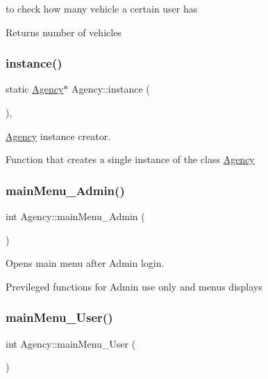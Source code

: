 to check how many vehicle a certain user has 

\begin{DoxyReturn}{Returns}
number of vehicles 
\end{DoxyReturn}
\mbox{\label{group___agency_ga573fab41076b962289fad1f14031b68c}} 
\subsubsection{\texorpdfstring{instance()}{instance()}}
{\footnotesize\ttfamily static \hyperlink{class_agency}{Agency}$\ast$ Agency\+::instance (\begin{DoxyParamCaption}{ }\end{DoxyParamCaption})\hspace{0.3cm}{\ttfamily [inline]}, {\ttfamily [static]}}



\hyperlink{class_agency}{Agency} instance creator. 

Function that creates a single instance of the class \hyperlink{class_agency}{Agency} \mbox{\label{group___agency_ga1c4e64231b979f1a1bc4881ebf3e3aed}} 
\subsubsection{\texorpdfstring{main\+Menu\+\_\+\+Admin()}{mainMenu\_Admin()}}
{\footnotesize\ttfamily int Agency\+::main\+Menu\+\_\+\+Admin (\begin{DoxyParamCaption}{ }\end{DoxyParamCaption})}



Opens main menu after Admin login. 

Previleged functions for Admin use only and menus displays \mbox{\label{group___agency_gaef1bbd6021ec5639b2503d8bd8ec4244}} 
\subsubsection{\texorpdfstring{main\+Menu\+\_\+\+User()}{mainMenu\_User()}}
{\footnotesize\ttfamily int Agency\+::main\+Menu\+\_\+\+User (\begin{DoxyParamCaption}{ }\end{DoxyParamCaption})}



